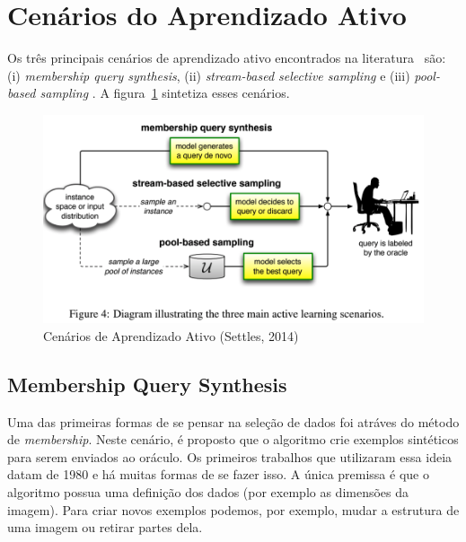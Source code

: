 

\section{Cenários do Aprendizado Ativo}
\label{sec:cenarios}

Os três principais cenários de aprendizado ativo encontrados na literatura~\citep{settles2014active} são: (i) \emph{membership query synthesis}, (ii) \emph{stream-based selective sampling} e (iii) \emph{pool-based sampling} . A figura~\ref{fig:ActiveLearningScenarios} sintetiza esses cenários.


\begin{figure}
  \centering
  \includegraphics[width=.8\textwidth]{figures/active_learning_scenarios.png}
  \caption{Cenários de Aprendizado Ativo (Settles, 2014)}
  \label{fig:ActiveLearningScenarios}
\end{figure}


\subsection{Membership Query Synthesis}
\label{sec:cenarios_membeship}

Uma das primeiras formas de se pensar na seleção de dados foi atráves do método de \emph{membership}. Neste cenário, é proposto que o algoritmo crie exemplos sintéticos para serem enviados ao oráculo. Os primeiros trabalhos que utilizaram essa ideia datam de 1980 \citep{shapiro1981algorithm, shapiro1982algorithmic, shapiro198algorithmic_2} e há muitas formas de se fazer isso. A única premissa é que o algoritmo possua uma definição dos dados (por exemplo as dimensões da imagem). Para criar novos exemplos podemos, por exemplo, mudar a estrutura de uma imagem ou retirar partes dela.

